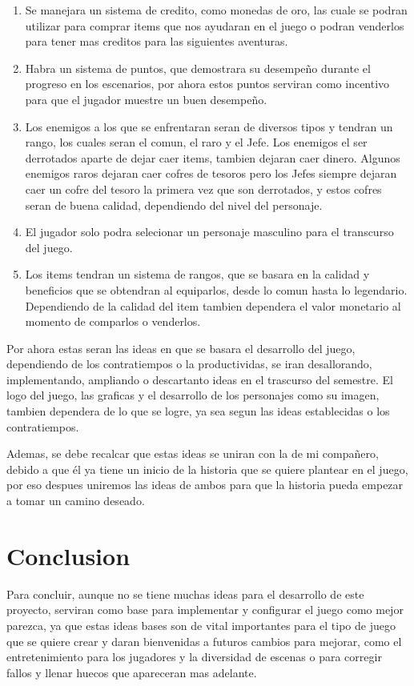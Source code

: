 \documentclass{article}
\begin{document}
\begin{enumerate}

    \item Se manejara un sistema de credito, como monedas de oro, las cuale se podran utilizar para comprar items que nos ayudaran en el juego o podran venderlos para tener mas creditos para las siguientes aventuras.
    \item Habra un sistema de puntos, que demostrara su desempeño durante el progreso en los escenarios, por ahora estos puntos serviran como incentivo para que el jugador muestre un buen desempeño.
    \item Los enemigos a los que se enfrentaran seran de diversos tipos y tendran un rango, los cuales seran el comun, el raro y el Jefe. Los enemigos el ser derrotados aparte de dejar caer items, tambien dejaran caer dinero. Algunos enemigos raros dejaran caer cofres de tesoros pero los Jefes siempre dejaran caer un cofre del tesoro la primera vez que son derrotados, y estos cofres seran de buena calidad, dependiendo del nivel del personaje.
    \item El jugador solo podra selecionar un personaje masculino para el transcurso del juego.
    \item Los items tendran un sistema de rangos, que se basara en la calidad y beneficios que se obtendran al equiparlos, desde lo comun hasta lo legendario. Dependiendo de la calidad del item tambien dependera el valor monetario al momento de comparlos o venderlos.
\end{enumerate}
Por ahora estas seran las ideas en que se basara el desarrollo del juego, dependiendo de los contratiempos o  la productividas, se iran desallorando, implementando, ampliando o descartanto ideas en el trascurso del semestre. El logo del juego, las graficas y el desarrollo de los personajes como su imagen, tambien dependera de lo que se logre, ya sea segun las ideas establecidas o los contratiempos. 

Ademas, se debe recalcar que estas ideas se uniran con la de mi compañero, debido a que él ya tiene un inicio de la historia que se quiere plantear en el juego, por eso despues uniremos las ideas de ambos para que la historia pueda empezar a tomar un camino deseado.
\newpage
\section{Conclusion} \label{conclusion}
Para concluir, aunque no se tiene muchas ideas para el desarrollo de este proyecto, serviran como base para implementar y configurar el juego como mejor parezca, ya que estas ideas bases son de vital importantes para el tipo de juego que se quiere crear y daran bienvenidas a futuros cambios para mejorar, como el entretenimiento para los jugadores y la diversidad de escenas o para corregir fallos y llenar huecos que apareceran mas adelante.
\end{document}
